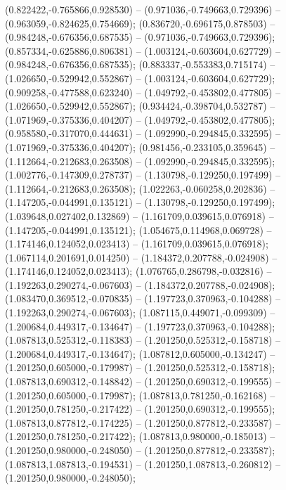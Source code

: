  (0.822422,-0.765866,0.928530) -- (0.971036,-0.749663,0.729396) -- (0.963059,-0.824625,0.754669);
 (0.836720,-0.696175,0.878503) -- (0.984248,-0.676356,0.687535) -- (0.971036,-0.749663,0.729396);
 (0.857334,-0.625886,0.806381) -- (1.003124,-0.603604,0.627729) -- (0.984248,-0.676356,0.687535);
 (0.883337,-0.553383,0.715174) -- (1.026650,-0.529942,0.552867) -- (1.003124,-0.603604,0.627729);
 (0.909258,-0.477588,0.623240) -- (1.049792,-0.453802,0.477805) -- (1.026650,-0.529942,0.552867);
 (0.934424,-0.398704,0.532787) -- (1.071969,-0.375336,0.404207) -- (1.049792,-0.453802,0.477805);
 (0.958580,-0.317070,0.444631) -- (1.092990,-0.294845,0.332595) -- (1.071969,-0.375336,0.404207);
 (0.981456,-0.233105,0.359645) -- (1.112664,-0.212683,0.263508) -- (1.092990,-0.294845,0.332595);
 (1.002776,-0.147309,0.278737) -- (1.130798,-0.129250,0.197499) -- (1.112664,-0.212683,0.263508);
 (1.022263,-0.060258,0.202836) -- (1.147205,-0.044991,0.135121) -- (1.130798,-0.129250,0.197499);
 (1.039648,0.027402,0.132869) -- (1.161709,0.039615,0.076918) -- (1.147205,-0.044991,0.135121);
 (1.054675,0.114968,0.069728) -- (1.174146,0.124052,0.023413) -- (1.161709,0.039615,0.076918);
 (1.067114,0.201691,0.014250) -- (1.184372,0.207788,-0.024908) -- (1.174146,0.124052,0.023413);
 (1.076765,0.286798,-0.032816) -- (1.192263,0.290274,-0.067603) -- (1.184372,0.207788,-0.024908);
 (1.083470,0.369512,-0.070835) -- (1.197723,0.370963,-0.104288) -- (1.192263,0.290274,-0.067603);
 (1.087115,0.449071,-0.099309) -- (1.200684,0.449317,-0.134647) -- (1.197723,0.370963,-0.104288);
 (1.087813,0.525312,-0.118383) -- (1.201250,0.525312,-0.158718) -- (1.200684,0.449317,-0.134647);
 (1.087812,0.605000,-0.134247) -- (1.201250,0.605000,-0.179987) -- (1.201250,0.525312,-0.158718);
 (1.087813,0.690312,-0.148842) -- (1.201250,0.690312,-0.199555) -- (1.201250,0.605000,-0.179987);
 (1.087813,0.781250,-0.162168) -- (1.201250,0.781250,-0.217422) -- (1.201250,0.690312,-0.199555);
 (1.087813,0.877812,-0.174225) -- (1.201250,0.877812,-0.233587) -- (1.201250,0.781250,-0.217422);
 (1.087813,0.980000,-0.185013) -- (1.201250,0.980000,-0.248050) -- (1.201250,0.877812,-0.233587);
 (1.087813,1.087813,-0.194531) -- (1.201250,1.087813,-0.260812) -- (1.201250,0.980000,-0.248050);

